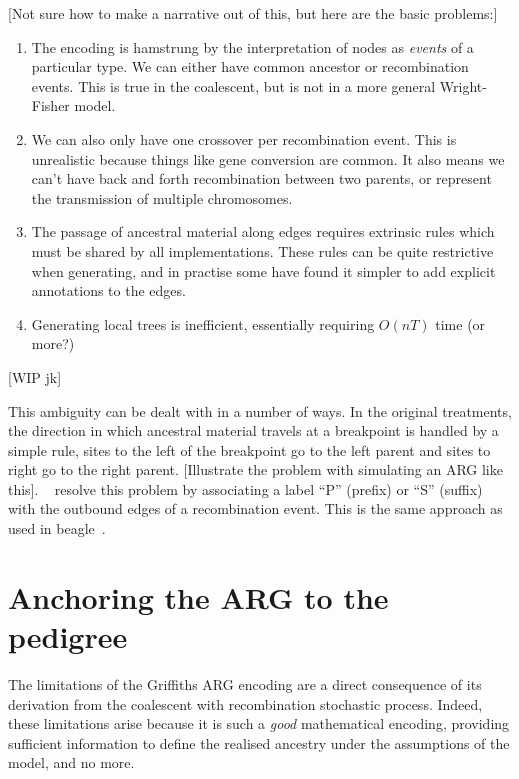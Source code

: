 \documentclass{article}
\begin{document}
[Not sure how to make a narrative out of this, but here are the
basic problems:]
\begin{enumerate}
\item The encoding is hamstrung by the interpretation of
nodes as \emph{events} of a particular type. We can either
have common ancestor or recombination events. This is true
in the coalescent, but is not in a more general Wright-Fisher
model.
\item We can also only have one crossover per recombination event.
This is unrealistic because things like gene conversion are common. It also
means we can't have back and forth recombination between
two parents, or represent the transmission of multiple chromosomes.
\item The passage of ancestral material along edges requires
extrinsic rules which must be shared by all implementations.
These rules can be quite restrictive when generating, and
in practise some have found it simpler to add explicit
annotations to the edges.
\item Generating local trees is inefficient, essentially requiring
$O(n T)$ time (or more?)
\end{enumerate}


[WIP jk]

This ambiguity can be dealt with in a number of ways. In the original
treatments, the direction in which ancestral material travels at
a breakpoint is handled by a simple rule, sites to the left of the
breakpoint go to the left parent and sites to right go to the
right parent. [Illustrate the problem with simulating an ARG
like this]. ~\cite{ignatieva2021kwarg} resolve this problem by
associating a label ``P'' (prefix) or ``S'' (suffix) with the
outbound edges of a recombination event. This is the same approach
as used in beagle~\citep{lyngso2005minimum}.

\section*{Anchoring the ARG to the pedigree}

The limitations of the Griffiths ARG encoding are a direct consequence
of its derivation from the coalescent with recombination stochastic process.
Indeed, these limitations arise because it is such a \emph{good}
mathematical encoding, providing sufficient information to
define the realised ancestry under the assumptions of the model,
and no more.
\end{document}
